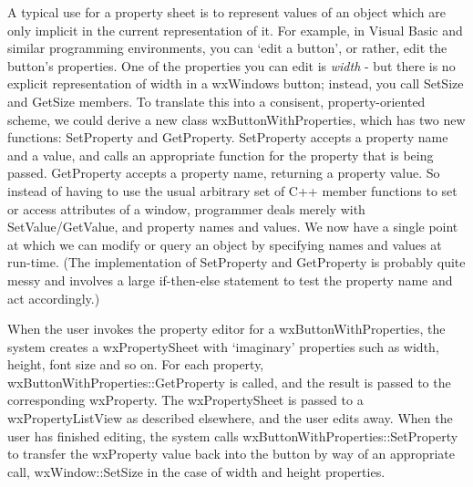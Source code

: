 A typical use for a property sheet is to represent values of an object
which are only implicit in the current representation of it. For
example, in Visual Basic and similar programming environments, you can
`edit a button', or rather, edit the button's properties.  One of the
properties you can edit is {\it width} - but there is no explicit
representation of width in a wxWindows button; instead, you call SetSize
and GetSize members. To translate this into a consisent,
property-oriented scheme, we could derive a new class
wxButtonWithProperties, which has two new functions: SetProperty and
GetProperty.  SetProperty accepts a property name and a value, and calls
an appropriate function for the property that is being passed.
GetProperty accepts a property name, returning a property value. So
instead of having to use the usual arbitrary set of C++ member functions
to set or access attributes of a window, programmer deals merely with
SetValue/GetValue, and property names and values.
We now have a single point at which we can modify or query an object by specifying
names and values at run-time. (The implementation of SetProperty and GetProperty
is probably quite messy and involves a large if-then-else statement to
test the property name and act accordingly.)

When the user invokes the property editor for a wxButtonWithProperties, the system
creates a wxPropertySheet with `imaginary' properties such as width, height, font size
and so on. For each property, wxButtonWithProperties::GetProperty is called, and the result is
passed to the corresponding wxProperty. The wxPropertySheet is passed to a wxPropertyListView
as described elsewhere, and the user edits away. When the user has finished editing, the system calls
wxButtonWithProperties::SetProperty to transfer the wxProperty value back into the button
by way of an appropriate call, wxWindow::SetSize in the case of width and height properties.



